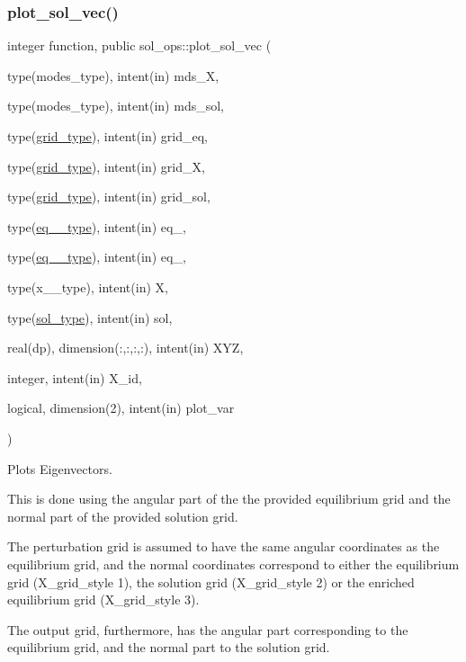 \subsubsection{\texorpdfstring{plot\+\_\+sol\+\_\+vec()}{plot\_sol\_vec()}}
{\footnotesize\ttfamily integer function, public sol\+\_\+ops\+::plot\+\_\+sol\+\_\+vec (\begin{DoxyParamCaption}\item[{type(modes\+\_\+type), intent(in)}]{mds\+\_\+X,  }\item[{type(modes\+\_\+type), intent(in)}]{mds\+\_\+sol,  }\item[{type(\hyperlink{structgrid__vars_1_1grid__type}{grid\+\_\+type}), intent(in)}]{grid\+\_\+eq,  }\item[{type(\hyperlink{structgrid__vars_1_1grid__type}{grid\+\_\+type}), intent(in)}]{grid\+\_\+X,  }\item[{type(\hyperlink{structgrid__vars_1_1grid__type}{grid\+\_\+type}), intent(in)}]{grid\+\_\+sol,  }\item[{type(\hyperlink{structeq__vars_1_1eq__1__type}{eq\+\_\+1\+\_\+type}), intent(in)}]{eq\+\_,  }\item[{type(\hyperlink{structeq__vars_1_1eq__2__type}{eq\+\_\+2\+\_\+type}), intent(in)}]{eq\+\_,  }\item[{type(x\+\_\+1\+\_\+type), intent(in)}]{X,  }\item[{type(\hyperlink{structsol__vars_1_1sol__type}{sol\+\_\+type}), intent(in)}]{sol,  }\item[{real(dp), dimension(\+:,\+:,\+:,\+:), intent(in)}]{X\+YZ,  }\item[{integer, intent(in)}]{X\+\_\+id,  }\item[{logical, dimension(2), intent(in)}]{plot\+\_\+var }\end{DoxyParamCaption})}



Plots Eigenvectors. 

This is done using the angular part of the the provided equilibrium grid and the normal part of the provided solution grid.

The perturbation grid is assumed to have the same angular coordinates as the equilibrium grid, and the normal coordinates correspond to either the equilibrium grid ({\ttfamily X\+\_\+grid\+\_\+style} 1), the solution grid ({\ttfamily X\+\_\+grid\+\_\+style} 2) or the enriched equilibrium grid ({\ttfamily X\+\_\+grid\+\_\+style} 3).

The output grid, furthermore, has the angular part corresponding to the equilibrium grid, and the normal part to the solution grid.

